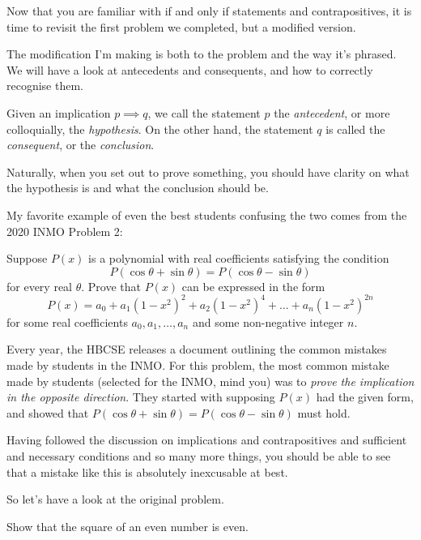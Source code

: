 


Now that you are familiar with if and only if statements and contrapositives, it is time to revisit the first problem we completed, but a modified version.

The modification I'm making is both to the problem and the way it's phrased. We will have a look at antecedents and consequents, and how to correctly recognise them.

Given an implication $p \implies q$, we call the statement $p$ the \textit{antecedent}, or more colloquially, the \textit{hypothesis}. On the other hand, the statement $q$ is called the \textit{consequent}, or the \textit{conclusion}.

Naturally, when you set out to prove something, you should have clarity on what the hypothesis is and what the conclusion should be.

My favorite example of even the best students confusing the two comes from the 2020 INMO Problem 2:

\begin{SNP}{\prb}Suppose $P(x)$ is a polynomial with real coefficients satisfying the condition
    \[
    P(\cos\theta + \sin\theta) = P(\cos\theta - \sin\theta)
    \]
    for every real $\theta$. Prove that $P(x)$ can be expressed in the form
    \[
    P(x) = a_0 + a_1 \left(1-x^2 \right)^2 + a_2 \left(1-x^2 \right)^4 + \dots + a_n \left(1-x^2 \right)^{2n}
    \]
    for some real coefficients $a_0, a_1, \ldots, a_n$ and some non-negative integer $n$.
\end{SNP}

Every year, the HBCSE releases a document outlining the common mistakes made by students in the INMO. For this problem, the most common mistake made by students (selected for the INMO, mind you) was to \textit{prove the implication in the opposite direction}. They started with supposing $P(x)$ had the given form, and showed that $P(\cos\theta + \sin\theta) = P(\cos\theta - \sin\theta)$ must hold.

Having followed the discussion on implications and contrapositives and sufficient and necessary conditions and so many more things, you should be able to see that a mistake like this is absolutely inexcusable at best.

So let's have a look at the original problem.

\begin{SNP}{\xmp}Show that the square of an even number is even.
\end{SNP}

